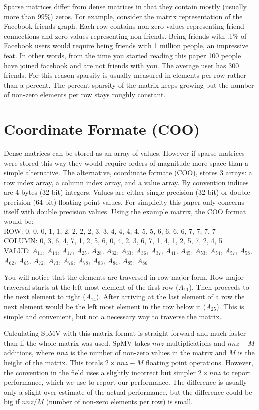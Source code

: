 \par Sparse matrices differ from dense matrices in that they contain mostly (usually more than 99\%) zeros. For example, consider the matrix representation of the Facebook friends graph. Each row contains non-zero values representing friend connections and zero values representing non-friends. Being friends with .1\% of Facebook users would require being friends with 1 million people, an impressive feat. In other words, from the time you started reading this paper 100 people have joined facebook and are not friends with you. The average user has 300 friends. For this reason sparsity is usually measured in elements per row rather than a percent. The percent sparsity of the matrix keeps growing but the number of non-zero elements per row stays roughly constant.
\section{Coordinate Formate (COO)}
\par Dense matrices can be stored as an array of values. However if sparse matrices were stored this way they would require orders of magnitude more space than a simple alternative. The alternative, coordinate formate (COO), stores 3 arrays: a row index array, a column index array, and a value array. By convention indices are 4 bytes (32-bit) integers. Values are either single-precision (32-bit) or double-precision (64-bit) floating point values. For simplicity this paper only concerns itself with double precision values. Using the example matrix, the COO format would be:\\
ROW:    0, 0, 0, 1, 1, 2, 2, 2, 2, 3, 3, 4, 4, 4, 4, 5, 5, 6, 6, 6, 6, 7, 7, 7, 7 \\ 
COLUMN: 0, 3, 6, 4, 7, 1, 2, 5, 6, 0, 4, 2, 3, 6, 7, 1, 4, 1, 2, 5, 7, 2, 4, 5\\ 
VALUE: $A_{11}$, $A_{14}$, $A_{17}$, $A_{25}$, $A_{28}$, $A_{32}$, $A_{33}$, $A_{36}$, $A_{37}$, $A_{41}$, $A_{45}$, $A_{53}$, $A_{54}$, $A_{57}$, $A_{58}$, $A_{62}$, $A_{65}$, $A_{72}$, $A_{73}$, $A_{76}$, $A_{78}$, $A_{83}$, $A_{84}$, $A_{85}$, $A_{86}$ \par
You will notice that the elements are traversed in row-major form. Row-major traversal starts at the left most element of the first row ($A_{11}$). Then proceeds to the next element to right ($A_{14}$). After arriving at the last element of a row the next element would be the left most element in the row below it ($A_{25}$). This is simple and convenient, but not a necessary way to traverse the matrix. 
\par Calculating SpMV with this matrix format is straight forward and much faster than if the whole matrix was used. SpMV takes $nnz$ multiplications and $nnz-M$ additions, where $nnz$ is the number of non-zero values in the matrix and $M$ is the height of the matrix. This totals $2\times nnz - M$ floating point operations. However, the convention in the field uses a slightly incorrect but simpler $2\times nnz$ to report performance, which we use to report our performance. The difference is usually only a slight over estimate of the actual performance, but the difference could be big if $nnz/M$ (number of non-zero elements per row) is small.
